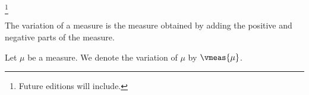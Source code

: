
\footnote{Future editions will include.}



The variation of a measure is the measure obtained by adding the positive and negative parts of the measure.



Let $\mu$ be a measure.
We denote the variation of $\mu$ by $\vmeas{\mu}$.
